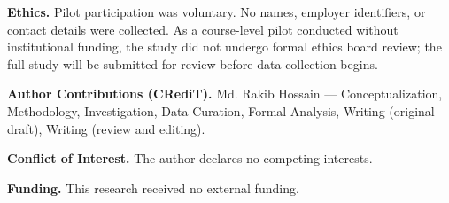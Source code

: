 \documentclass[conference]{IEEEtran}
\begin{document}
\textbf{Ethics.} Pilot participation was voluntary. No names, employer
identifiers, or contact details were collected. As a course-level pilot
conducted without institutional funding, the study did not undergo formal
ethics board review; the full study will be submitted for review before
data collection begins.

\textbf{Author Contributions (CRediT).} Md. Rakib Hossain ---
Conceptualization, Methodology, Investigation, Data Curation, Formal
Analysis, Writing (original draft), Writing (review and editing).

\textbf{Conflict of Interest.} The author declares no competing
interests.

\textbf{Funding.} This research received no external funding.



\end{document}
